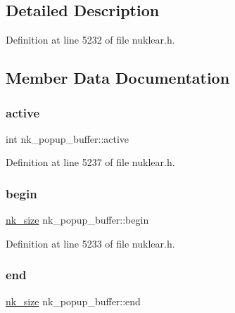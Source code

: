 \subsection{Detailed Description}


Definition at line 5232 of file nuklear.\+h.



\subsection{Member Data Documentation}
\mbox{\label{structnk__popup__buffer_a4553982d21151ff00fd95c1abc709ef6}} 
\subsubsection{\texorpdfstring{active}{active}}
{\footnotesize\ttfamily int nk\+\_\+popup\+\_\+buffer\+::active}



Definition at line 5237 of file nuklear.\+h.

\mbox{\label{structnk__popup__buffer_ae93e42070c567aa61352d9c832496c77}} 
\subsubsection{\texorpdfstring{begin}{begin}}
{\footnotesize\ttfamily \mbox{\hyperlink{nuklear_8h_a84c0fc50dec5501be327b33d41d9010c}{nk\+\_\+size}} nk\+\_\+popup\+\_\+buffer\+::begin}



Definition at line 5233 of file nuklear.\+h.

\mbox{\label{structnk__popup__buffer_a630c901d09e64b5945e5a9c760153496}} 
\subsubsection{\texorpdfstring{end}{end}}
{\footnotesize\ttfamily \mbox{\hyperlink{nuklear_8h_a84c0fc50dec5501be327b33d41d9010c}{nk\+\_\+size}} nk\+\_\+popup\+\_\+buffer\+::end}



